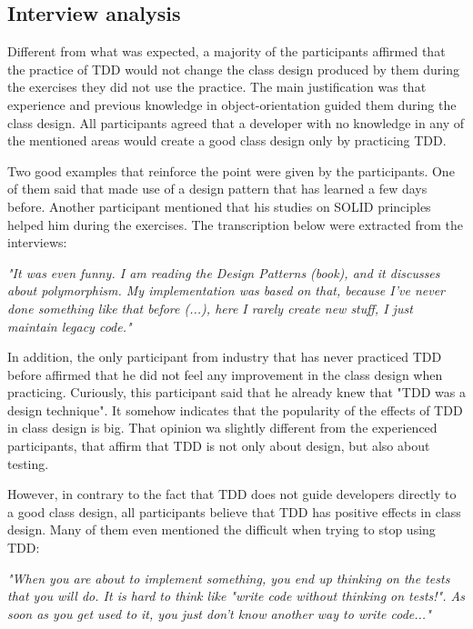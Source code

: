 \documentclass[conference]{IEEEtran}
\begin{document}
\subsection{Interview analysis}

Different from what was expected, a majority of the participants affirmed that the
practice of TDD would not change the class design produced by them during the exercises
they did not use the practice.
The main justification was that experience and previous knowledge in object-orientation
guided them during the class design. All participants agreed that a developer with no
knowledge in any of the mentioned areas would create a good class design only by practicing
TDD.

Two good examples that reinforce the point were given by the participants. One of them
said that made use of a design pattern \cite{gof} that has learned a few days before. Another
participant mentioned that his studies on SOLID principles helped him during the exercises.
The transcription below were extracted from the interviews:

\begin{framed}
	\textit{"It was even funny. I am reading the Design Patterns (book), and it discusses about polymorphism. 
	My implementation was based on that, because I've never done something like that before (...), here I rarely
	create new stuff, I just maintain legacy code."}
\end{framed}

In addition, the only participant from industry that has never practiced TDD before
affirmed that he did not feel any improvement in the class design when practicing.
Curiously, this participant said that he already knew that "TDD was a design technique".
It somehow indicates that the popularity of the effects of TDD in class design
is big.
That opinion wa slightly different from the experienced participants, 
that affirm that TDD is not only about design, but also about testing.

However, in contrary to the fact that TDD does not guide developers directly to a
good class design, all participants believe that TDD has positive effects in class design.
Many of them even mentioned the difficult when trying to stop using TDD:

\begin{framed}

	\textit{"When you are about to implement something, you end up thinking on the tests that you will do. 
	It is hard to think like "write code without thinking on tests!". As soon as you get used to it, 
	you just don't know another way to write code..."}
	
\end{framed}
\end{document}
